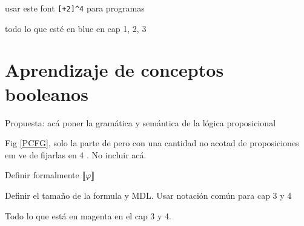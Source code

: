 \documentclass[a4paper,12pt,oneside]{book}
\begin{document}
    usar este font \verb#[+2]^4# para programas

    todo lo que esté en blue en cap 1, 2, 3

    \color{black}


    
    

    \part{Aprendizaje de conceptos booleanos}
    \color{magenta}
    Propuesta: acá poner la gramática y semántica de la lógica proposicional
    
    Fig \ref{PCFG}, solo la parte de \grambool pero con una cantidad no acotad de proposiciones em ve de fijarlas en 4 . No incluir \gramboolxor acá.

    Definir formalmente $\llbracket \varphi\rrbracket$

    Definir el tamaño de la formula y MDL. Usar notación común para cap 3 y 4

    Todo lo que está en magenta en el cap 3 y 4.


    \color{black}

    
    
    
    \appendix
    
    
    
    
    
    
\end{document}
